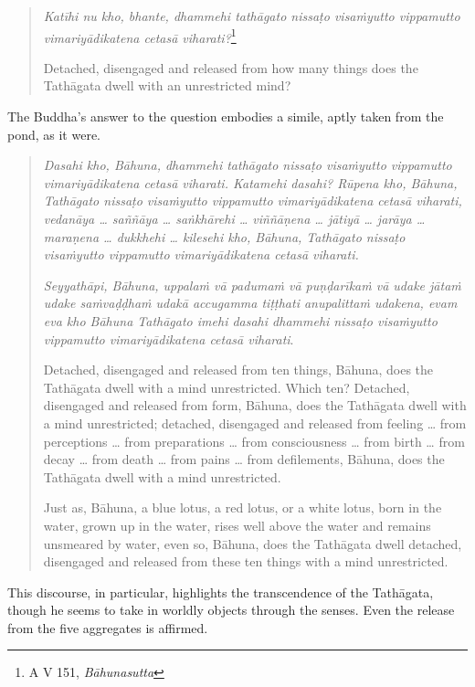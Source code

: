 \enlargethispage{\baselineskip}

\begin{quote}
\emph{Katīhi nu kho, bhante, dhammehi tathāgato nissaṭo visaṁyutto vippamutto vimariyādikatena cetasā viharati?}\footnote{A V 151, \emph{Bāhunasutta}}

Detached, disengaged and released from how many things does the Tathāgata dwell with an unrestricted mind?
\end{quote}

The Buddha's answer to the question embodies a simile, aptly taken from the pond, as it were.

\begin{quote}
\emph{Dasahi kho, Bāhuna, dhammehi tathāgato nissaṭo visaṁyutto vippamutto vimariyādikatena cetasā viharati. Katamehi dasahi? Rūpena kho, Bāhuna, Tathāgato nissaṭo visaṁyutto vippamutto vimariyādikatena cetasā viharati, vedanāya \ldots{} saññāya \ldots{} saṅkhārehi \ldots{} viññāṇena \ldots{} jātiyā \ldots{} jarāya \ldots{} maraṇena \ldots{} dukkhehi \ldots{} kilesehi kho, Bāhuna, Tathāgato nissaṭo visaṁyutto vippamutto vimariyādikatena cetasā viharati.}

\emph{Seyyathāpi, Bāhuna, uppalaṁ vā padumaṁ vā puṇḍarīkaṁ vā udake jātaṁ udake saṁvaḍḍhaṁ udakā accugamma tiṭṭhati anupalittaṁ udakena, evam eva kho Bāhuna Tathāgato imehi dasahi dhammehi nissaṭo visaṁyutto vippamutto vimariyādikatena cetasā viharati}.

Detached, disengaged and released from ten things, Bāhuna, does the Tathāgata dwell with a mind unrestricted. Which ten? Detached, disengaged and released from form, Bāhuna, does the Tathāgata dwell with a mind unrestricted; detached, disengaged and released from feeling \ldots{} from perceptions \ldots{} from preparations \ldots{} from consciousness \ldots{} from birth \ldots{} from decay \ldots{} from death \ldots{} from pains \ldots{} from defilements, Bāhuna, does the Tathāgata dwell with a mind unrestricted.

Just as, Bāhuna, a blue lotus, a red lotus, or a white lotus, born in the water, grown up in the water, rises well above the water and remains unsmeared by water, even so, Bāhuna, does the Tathāgata dwell detached, disengaged and released from these ten things with a mind unrestricted.
\end{quote}

This discourse, in particular, highlights the transcendence of the Tathāgata, though he seems to take in worldly objects through the senses. Even the release from the five aggregates is affirmed.


